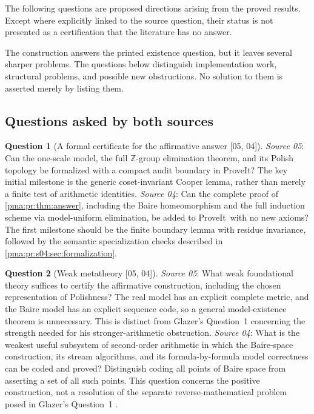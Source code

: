 \documentclass[11pt]{article}
\numberwithin{equation}{section}
\theoremstyle{definition}
\newtheorem{question}[question]{Question}
\theoremstyle{remark}
\newcommand{\Z}{\mathbb Z}
\newcommand{\repo}{\textsf{ProveIt}}
\newcommand{\src}[1]{\textup{\textsf{\small[#1]}}}
\begin{document}
The following questions are proposed directions arising from the proved
results. Except where explicitly linked to the source question, their
status is not presented as a certification that the literature has no
answer.

The construction answers the printed existence question, but it leaves
several sharper problems. The questions below distinguish implementation
work, structural problems, and possible new obstructions. No solution to
them is asserted merely by listing them.

\subsection{Questions asked by both sources}\label{pma:pr:sec:qshared}

\begin{question}[A formal certificate for the affirmative answer \src{05, 04}]\label{pma:pr:q:formal}
\emph{Source 05}: Can the one-scale model, the full $\Z$-group elimination
theorem, and its Polish topology be formalized with a compact audit boundary in
ProveIt? The key initial milestone is the generic coset-invariant Cooper lemma,
rather than merely a finite test of arithmetic identities.
\emph{Source 04}: Can the complete proof of \cref{pma:pr:thm:answer}, including
the Baire homeomorphism and the full induction scheme via model-uniform
elimination, be added to \repo\ with no new axioms? The first milestone should
be the finite boundary lemma with residue invariance, followed by the semantic
specialization checks described in \cref{pma:pr:s04:sec:formalization}.
\end{question}

\begin{question}[Weak metatheory \src{05, 04}]\label{pma:pr:q:metatheory}
\emph{Source 05}: What weak foundational theory suffices to certify the
affirmative construction, including the chosen representation of Polishness?
The real model has an explicit complete metric, and the Baire model has an
explicit sequence code, so a general model-existence theorem is unnecessary.
This is distinct from Glazer's Question~1 concerning the strength needed for
his stronger-arithmetic obstruction.
\emph{Source 04}: What is the weakest useful subsystem of second-order
arithmetic in which the Baire-space construction, its stream algorithms, and
its formula-by-formula model correctness can be coded and proved? Distinguish
coding all points of Baire space from asserting a set of all such points. This
question concerns the positive construction, not a resolution of the separate
reverse-mathematical problem posed in Glazer's Question~1 \cite{Glazer}.
\end{question}
\end{document}
